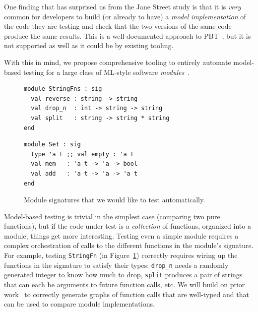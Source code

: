 One finding that has surprised us from the Jane Street study is that it is {\em
very} common for developers to build (or already to have) a {\em model
implementation} of the code they are testing and check that the two versions of
the same code produce the same results.  This is a well-documented approach to
PBT~\cite{hughes_experiences_2016}, but it is not supported as well as it could
be by existing tooling.

With this in mind, we propose comprehensive tooling to entirely automate
model-based testing for a large class of ML-style software
{\em modules}~\cite{macqueen_modules_1984}.

\begin{figure}[h]
  \begin{minipage}{.45\textwidth}
\begin{lstlisting}
module StringFns : sig
  val reverse : string -> string
  val drop_n  : int -> string -> string
  val split   : string -> string * string
end
\end{lstlisting}
  \end{minipage}
  \qquad\qquad
  \begin{minipage}{.45\textwidth}
\begin{lstlisting}
module Set : sig
  type 'a t ;; val empty : 'a t
  val mem   : 'a t -> 'a -> bool
  val add   : 'a t -> 'a -> 'a t
end
\end{lstlisting}
  \end{minipage}
  \caption{Module signatures that we would like to test automatically.}\label{fig:sigs}
\end{figure}

Model-based testing is trivial in the simplest case (comparing two pure
functions), but if the code under test is a {\em collection} of functions,
organized into a module, things get more interesting. Testing even a simple
module requires a complex orchestration of calls to the different functions in
the module's signature. For example, testing \lstinline{StringFn} (in
Figure~\ref{fig:sigs}) correctly requires wiring up the functions in the
signature to satisfy their types: \lstinline{drop_n} needs a randomly generated
integer to know how much to drop, \lstinline{split} produces a pair of strings
that can each be arguments to future function calls, etc. We will build on prior
work~\cite{hughes_experiences_2016} to correctly generate graphs of function
calls that are well-typed and that can be used to compare module implementations.

